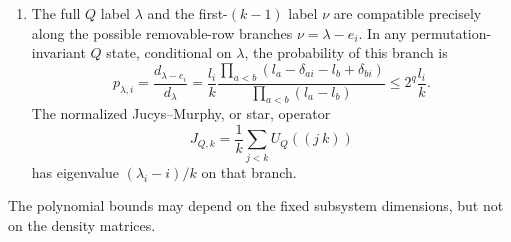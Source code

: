 \begin{lemma}
\begin{enumerate}
\begin{equation}
 \Tr\rho\exp\bigl(b(L_\rho-F_Q)\bigr)\le\poly(k)
       \qquad(0\le b\le1).
\end{equation}
\item The full $Q$ label $\lambda$ and the first-$(k-1)$ label $\nu$
are compatible precisely along the possible removable-row branches
$\nu=\lambda-e_i$.  In any permutation-invariant $Q$ state, conditional
on $\lambda$, the probability of this branch is
\begin{equation}\label{replicas:branch-probability}
 p_{\lambda,i}=\frac{d_{\lambda-e_i}}{d_\lambda}
 =\frac{l_i}{k}\frac{\prod_{a<b}(l_a-\delta_{ai}-l_b+\delta_{bi})}
                         {\prod_{a<b}(l_a-l_b)}
 \le 2^q\frac{l_i}{k}.
\end{equation}
The normalized Jucys--Murphy, or star, operator
\cite[Section~2]{VershikOkounkov2005}
\begin{equation}\label{replicas:star-definition}
 J_{Q,k}=\frac1k\sum_{j<k}U_Q((j\ k))
\end{equation}
has eigenvalue $(\lambda_i-i)/k$ on that branch.
\end{enumerate}
The polynomial bounds may depend on the fixed subsystem dimensions,
but not on the density matrices.
\end{lemma}

